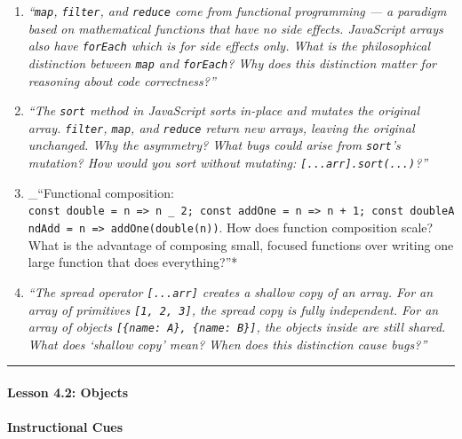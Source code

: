 \documentclass[
  justified,
  openright,
]{tufte-book}
\let\subsubsection\paragraph
\let\paragraph\paragraph
\let\subsubsection\paragraph
\let\paragraph\paragraph
\begin{document}
\begin{enumerate}
\def\labelenumi{\arabic{enumi}.}
\item
  \emph{``\texttt{map}, \texttt{filter}, and \texttt{reduce} come from
  functional programming --- a paradigm based on mathematical functions
  that have no side effects. JavaScript arrays also have
  \texttt{forEach} which is for side effects only. What is the
  philosophical distinction between \texttt{map} and \texttt{forEach}?
  Why does this distinction matter for reasoning about code
  correctness?''}
\item
  \emph{``The \texttt{sort} method in JavaScript sorts in-place and
  mutates the original array. \texttt{filter}, \texttt{map}, and
  \texttt{reduce} return new arrays, leaving the original unchanged. Why
  the asymmetry? What bugs could arise from \texttt{sort}'s mutation?
  How would you sort without mutating:
  \texttt{{[}...arr{]}.sort(...)}?''}
\item
  \_``Functional composition:
  \texttt{const\ double\ =\ n\ =\textgreater{}\ n\ \_\ 2;\ const\ addOne\ =\ n\ =\textgreater{}\ n\ +\ 1;\ const\ doubleAndAdd\ =\ n\ =\textgreater{}\ addOne(double(n))}.
  How does function composition scale? What is the advantage of
  composing small, focused functions over writing one large function
  that does everything?''*
\item
  \emph{``The spread operator \texttt{{[}...arr{]}} creates a shallow
  copy of an array. For an array of primitives \texttt{{[}1,\ 2,\ 3{]}},
  the spread copy is fully independent. For an array of objects
  \texttt{{[}\{name:\ \textquotesingle{}A\textquotesingle{}\},\ \{name:\ \textquotesingle{}B\textquotesingle{}\}{]}},
  the objects inside are still shared. What does `shallow copy' mean?
  When does this distinction cause bugs?''}
\end{enumerate}

\begin{center}\rule{0.5\linewidth}{0.5pt}\end{center}

\subsubsection{Lesson 4.2: Objects}\label{lesson-4.2-objects}

\paragraph{Instructional Cues}\label{instructional-cues-5}
\end{document}
